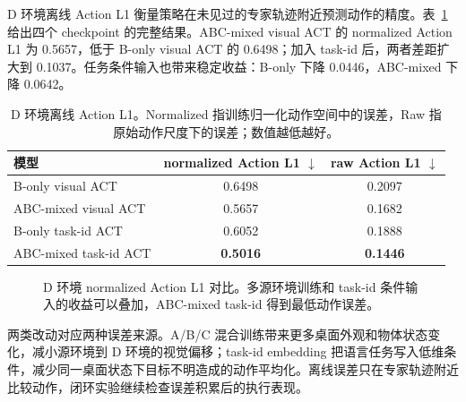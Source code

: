 \documentclass[11pt,a4paper,fontset=fandol]{ctexart}
\newcommand{\actionlone}{Action L1}
\newcommand{\best}[1]{\textbf{\textcolor{sourceblue}{#1}}}
\begin{document}
D 环境离线 \actionlone{} 衡量策略在未见过的专家轨迹附近预测动作的精度。表~\ref{tab:d_action_l1_v2} 给出四个 checkpoint 的完整结果。ABC-mixed visual ACT 的 normalized \actionlone{} 为 0.5657，低于 B-only visual ACT 的 0.6498；加入 task-id 后，两者差距扩大到 0.1037。任务条件输入也带来稳定收益：B-only 下降 0.0446，ABC-mixed 下降 0.0642。

\begin{table}[!htbp]
\centering
\small
\caption{D 环境离线 \actionlone{}。Normalized 指训练归一化动作空间中的误差，Raw 指原始动作尺度下的误差；数值越低越好。}
\label{tab:d_action_l1_v2}
\begin{tabular}{lcc}
\toprule
模型 & normalized \actionlone{} $\downarrow$ & raw \actionlone{} $\downarrow$ \\
\midrule
B-only visual ACT & 0.6498 & 0.2097 \\
ABC-mixed visual ACT & 0.5657 & 0.1682 \\
B-only task-id ACT & 0.6052 & 0.1888 \\
ABC-mixed task-id ACT & \best{0.5016} & \best{0.1446} \\
\bottomrule
\end{tabular}
\end{table}

\begin{figure}[!htbp]
\centering
{}
\caption{D 环境 normalized \actionlone{} 对比。多源环境训练和 task-id 条件输入的收益可以叠加，ABC-mixed task-id 得到最低动作误差。}
\label{fig:d_action_l1_v2}
\end{figure}

两类改动对应两种误差来源。A/B/C 混合训练带来更多桌面外观和物体状态变化，减小源环境到 D 环境的视觉偏移；task-id embedding 把语言任务写入低维条件，减少同一桌面状态下目标不明造成的动作平均化。离线误差只在专家轨迹附近比较动作，闭环实验继续检查误差积累后的执行表现。
\end{document}
